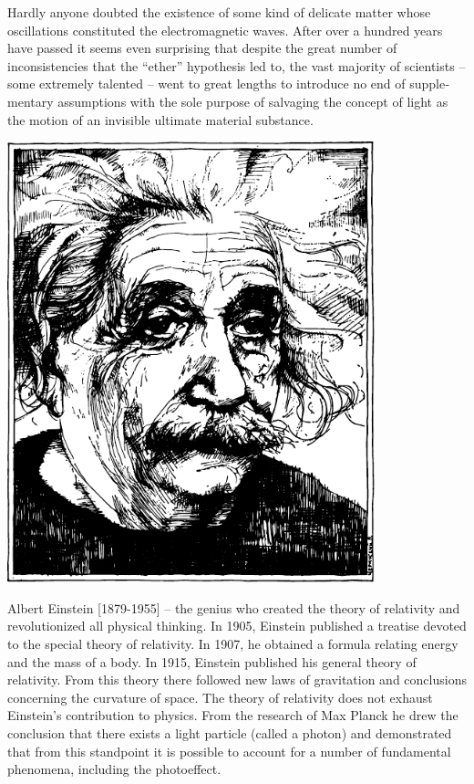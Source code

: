 Hardly anyone doubted the existence of some kind of delicate matter whose oscillations constituted the electromagnetic waves. After over a hundred years have passed it seems even surprising that despite the great number of inconsistencies that the ``ether'' hypothesis led to, the vast majority of scientists -- some extremely talented -- went to great lengths to introduce no end of supple­mentary assumptions with the sole purpose of salvaging the concept of light as the motion of an invisible ultimate material substance.

\newpage
\begin{center}
\includegraphics[width=0.8\textwidth]{figures/einstein.pdf}
\end{center}
{\small \textsf{{Albert Einstein [1879-1955]}} -- \textsf{\footnotesize the genius who created the theory of relativity and revolutionized all physical thinking. In 1905, Einstein published a treatise devoted to the special theory of relativity. In 1907, he obtained a formula relating energy and the mass of a body. In 1915, Einstein published his general theory of relativity. From this theory there followed new laws of gravita­tion and conclusions concerning the curvature of space. The theory of relativity does not exhaust Einstein's contribution to physics. From the research of Max Planck he drew the conclu­sion that there exists a light particle (called a photon) and demon­strated that from this standpoint it is possible to account for a number of fundamental phenomena, including the photoeffect.}}

